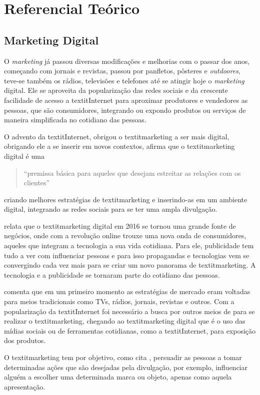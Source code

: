 \chapter[Referencial Teórico]{Referencial Teórico}
\section{Marketing Digital}
O \textit{marketing} já passou diversas modificações e melhorias com o passar dos anos, começando com jornais e revistas, passou por panfletos, pôsteres e \textit{outdoores}, teve-se também os rádios, televisões e telefones até se atingir hoje o \textit{marketing} digital. Ele se aproveita da popularização das redes sociais e da crescente facilidade de acesso a textit{Internet} para aproximar produtores e vendedores as pessoas, que são consumidores, integrando ou expondo produtos ou serviços de maneira simplificada no cotidiano das pessoas.

O advento da textit{Internet}, obrigou o textit{marketing} a ser mais digital, obrigando ele a se inserir em novos contextos, \cite{canto2017} afirma que o textit{marketing} digital é uma \begin{quote} ``premissa básica para aqueles que desejam estreitar as relações com os clientes''\end{quote} criando melhores estratégias de textit{marketing} e inserindo-as em um ambiente digital, integrando as redes sociais para se ter uma ampla divulgação.

\cite[p.2]{ryan2016} relata que o textit{marketing} digital em 2016 se tornou uma grande fonte de negócios, onde com a revolução online trouxe uma nova onda de consumidores, aqueles que integram a tecnologia a sua vida cotidiana. Para ele, publicidade tem tudo a ver com influenciar pessoas e para isso propagandas e tecnologias vem se convergindo cada vez mais para se criar um novo panorama de textit{marketing}. A tecnologia e a publicidade se tornaram parte do cotidiano das pessoas.

\cite{santos2014} comenta que em um primeiro momento as estratégias de mercado eram voltadas para meios tradicionais como TVs, rádios, jornais, revistas e outros. Com a popularização da textit{Internet} foi necessário a busca por outros meios de para se realizar
o textit{marketing}, chegando ao textit{marketing} digital que é o uso das mídias sociais ou de ferramentas cotidianas, como a textit{Internet}, para exposição dos produtos.

O textit{marketing} tem por objetivo, como cita \cite{ryan2016}, persuadir as pessoas a tomar determinadas ações que são desejadas pela divulgação, por exemplo, influenciar alguém a escolher uma determinada marca ou objeto, apenas como aquela apresentação.

